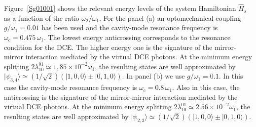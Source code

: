 \documentclass[aps,pra,twocolumn,floatfix,longbibliography, superscriptaddress]{revtex4-1}
\begin{document}
Figure~\ref{Sg01001} shows the relevant energy levels of the system Hamiltonian
$\hat H_s$ as a
function of the ratio $\omega_2/\omega_1$. 
For the  panel (a) an optomechanical
coupling $g/\omega_1 = 0.01$ has been used and  the cavity-mode
resonance frequency is $\omega_c =0.475\, \omega_1$. The lowest energy anticrossing
corresponds to the resonance condition for the DCE. The higher energy one is the signature of the mirror-mirror interaction mediated by the virtual DCE photons. At the minimum energy splitting $2 \lambda^{01}_{10} \simeq 1,85 \times 10^{-2} \omega_1$, the
resulting states are well approximated by $|\psi_{3,4} \rangle \simeq (1/\sqrt{2}) (|1,0,0 \rangle \pm |0,1,0 \rangle)$.
In panel (b) we use $g/\omega_1 = 0.1$. In this case the cavity-mode
resonance frequency is $\omega_c =0.8\, \omega_1$. Also in this case, the  anticrossing
is the signature of the mirror-mirror
interaction mediated by the virtual DCE photons.  At the minimum energy splitting $2 \lambda^{01}_{10} \simeq 2.56 \times 10^{-2} \omega_1$, the
resulting states are well approximated by $|\psi_{2,3} \rangle \simeq (1/\sqrt{2}) (|1,0,0 \rangle \pm |0,1,0 \rangle)$.
\end{document}
